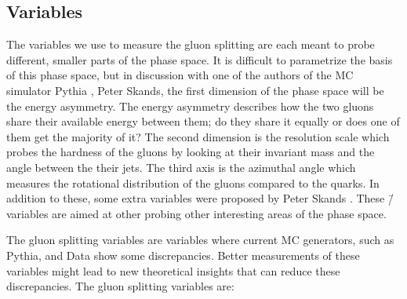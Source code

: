 \subsection{Variables}
\label{subsec:q:gluon_splitting_variables}
The variables we use to measure the gluon splitting are each meant to probe different, smaller parts of the phase space. It is difficult to parametrize the basis of this phase space, but in discussion with one of the authors of the MC simulator Pythia \autocite{sjostrandIntroductionPYTHIA2015}, Peter Skands, the first dimension of the phase space will be the energy asymmetry. The energy asymmetry describes how the two gluons share their available energy between them; do they share it equally or does one of them get the majority of it? The second dimension is the resolution scale which probes the hardness of the gluons by looking at their invariant mass and the angle between the their jets. The third axis is the azimuthal angle which measures the rotational distribution of the gluons compared to the quarks. In addition to these, some extra variables were proposed by Peter Skands \autocite{skandsPeterSkands2019}. These \=/variables are aimed at other probing other interesting areas of the phase space. 
 
The gluon splitting variables are variables where current MC generators, such as Pythia, and Data show some discrepancies. Better measurements of these variables might lead to new theoretical insights that can reduce these discrepancies. The gluon splitting variables are:


